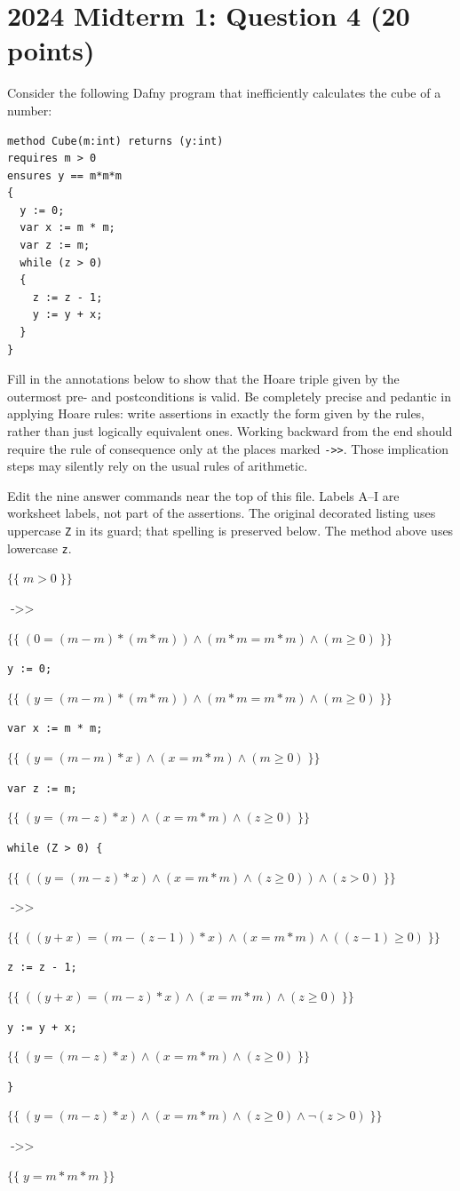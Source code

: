 \documentclass[11pt]{article}
\newcommand{\answerA}{(0 = (m - m) * (m * m)) \land (m * m = m * m) \land (m \geq 0)}
\newcommand{\answerB}{(y = (m - m) * (m * m)) \land (m * m = m * m) \land (m \geq 0)}
\newcommand{\answerC}{(y = (m - m) * x) \land (x = m * m) \land (m \geq 0)}
\newcommand{\answerD}{(y = (m - z) * x) \land (x = m * m) \land (z \geq 0)}
\newcommand{\answerE}{((y = (m - z) * x) \land (x = m * m) \land (z \geq 0)) \land (z > 0)}
\newcommand{\answerF}{((y + x) = (m - (z - 1)) * x) \land (x = m * m) \land ((z - 1) \geq 0)}
\newcommand{\answerG}{((y + x) = (m - z) * x) \land (x = m * m) \land (z \geq 0)}
\newcommand{\answerH}{(y = (m - z) * x) \land (x = m * m) \land (z \geq 0)}
\newcommand{\answerI}{(y = (m - z) * x) \land (x = m * m) \land (z \geq 0) \land \neg (z > 0)}
\newcommand{\assertion}[2]{%
  \noindent\makebox[1.8em][l]{\textsf{#1}}%
  $\{\!\{\;#2\;\}\!\}$\par\smallskip}
\newcommand{\code}[1]{\noindent\hspace*{1.8em}\texttt{#1}\par\smallskip}
\newcommand{\consequence}{\mathrel{\texttt{->>}}}
\begin{document}
\section*{2024 Midterm 1: Question 4 (20 points)}
Consider the following Dafny program that inefficiently calculates the cube
of a number:
\begin{verbatim}
method Cube(m:int) returns (y:int)
requires m > 0
ensures y == m*m*m
{
  y := 0;
  var x := m * m;
  var z := m;
  while (z > 0)
  {
    z := z - 1;
    y := y + x;
  }
}
\end{verbatim}
Fill in the annotations below to show that the Hoare triple given by the
outermost pre- and postconditions is valid. Be completely precise and
pedantic in applying Hoare rules: write assertions in exactly the form
given by the rules, rather than just logically equivalent ones. Working
backward from the end should require the rule of consequence only at the
places marked \texttt{->>}. Those implication steps may silently rely on
the usual rules of arithmetic.

\medskip
\noindent Edit the nine answer commands near the top of this file.
Labels A--I are worksheet labels, not part of the assertions.
The original decorated listing uses uppercase \texttt{Z} in its guard;
that spelling is preserved below. The method above uses lowercase \texttt{z}.
\medskip

\assertion{}{m > 0}
\noindent\hspace*{1.8em}$\consequence$\par\smallskip
\assertion{A}{\answerA}
\code{y := 0;}
\assertion{B}{\answerB}
\code{var x := m * m;}
\assertion{C}{\answerC}
\code{var z := m;}
\assertion{D}{\answerD}
\code{while (Z > 0) \{}
\assertion{E}{\answerE}
\noindent\hspace*{1.8em}$\consequence$\par\smallskip
\assertion{F}{\answerF}
\code{\quad z := z - 1;}
\assertion{G}{\answerG}
\code{\quad y := y + x;}
\assertion{H}{\answerH}
\code{\}}
\assertion{I}{\answerI}
\noindent\hspace*{1.8em}$\consequence$\par\smallskip
\assertion{}{y = m * m * m}
\end{document}
